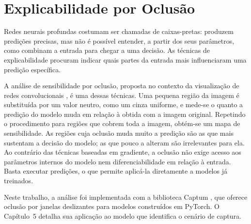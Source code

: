 \section{Explicabilidade por Oclusão}
\label{sec:explicabilidade-oclusao}

Redes neurais profundas costumam ser chamadas de caixas-pretas: produzem predições precisas, mas não é possível entender, a partir dos seus parâmetros, como combinam a entrada para chegar a uma decisão. As técnicas de explicabilidade procuram indicar quais partes da entrada mais influenciaram uma predição específica.

A análise de sensibilidade por oclusão, proposta no contexto da visualização de redes convolucionais \cite{zeiler2014visualizing}, é uma dessas técnicas. Uma pequena região da imagem é substituída por um valor neutro, como um cinza uniforme, e mede-se o quanto a predição do modelo muda em relação à obtida com a imagem original. Repetindo o procedimento para regiões que cobrem toda a imagem, obtém-se um mapa de sensibilidade. As regiões cuja oclusão muda muito a predição são as que mais sustentam a decisão do modelo; as que pouco a alteram são irrelevantes para ela. Ao contrário das técnicas baseadas em gradiente, a oclusão não exige acesso aos parâmetros internos do modelo nem diferenciabilidade em relação à entrada. Basta executar predições, o que permite aplicá-la diretamente a modelos já treinados.

Neste trabalho, a análise foi implementada com a biblioteca Captum \cite{kokhlikyan2020captum}, que oferece oclusão por janelas deslizantes para modelos construídos em PyTorch. O Capítulo~5 detalha sua aplicação ao modelo que identifica o cenário de captura.
